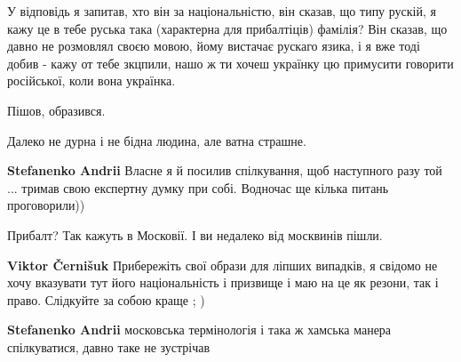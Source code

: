 \begin{itemize}
У відповідь я запитав, хто він за національністю, він сказав, що типу рускій, я
кажу це в тебе руська така (характерна для прибалтіців) фамілія? Він сказав, що
давно не розмовлял своєю мовою, йому вистачає рускаго язика, і я вже тоді добив
- кажу от тебе зкцпили, нашо ж ти хочеш українку цю примусити говорити
російської, коли вона українка.

Пішов, образився.

Далеко не дурна і не бідна людина, але ватна страшне.

\begin{itemize}
 
\textbf{Stefanenko Andrii}
Власне я й посилив спілкування, щоб наступного разу той ... тримав свою експертну думку при собі.
Водночас ще кілька питань проговорили))

 
Прибалт? Так кажуть в Московії. І ви недалеко від москвинів пішли.

 
\textbf{Viktor Černišuk} Прибережіть свої образи для ліпших випадків, я свідомо не хочу вказувати тут його національність і призвище і маю на це як резони, так і право. Слідкуйте за собою краще ; )

 
\textbf{Stefanenko Andrii} московська термінологія і така ж хамська манера спілкуватися, давно таке не зустрічав
\end{itemize}

 

\end{itemize}
